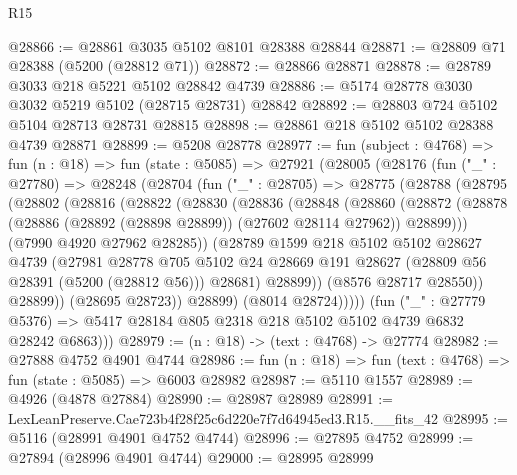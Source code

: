 \begin{lexlean}{R15}
\begin{coremodule}
{{{{{{{{{{{@28866 := @28861 @3035 @5102 @8101 @28388 @28844
@28871 := @28809 @71 @28388 (@5200 (@28812 @71))
@28872 := @28866 @28871
@28878 := @28789 @3033 @218 @5221 @5102 @28842 @4739
@28886 := @5174 @28778 @3030 @3032 @5219 @5102 (@28715 @28731) @28842
@28892 := @28803 @724 @5102 @5104 @28713 @28731 @28815
@28898 := @28861 @218 @5102 @5102 @28388 @4739 @28871
@28899 := @5208 @28778
@28977 := fun (subject : @4768) =>
  fun (n : @18) =>
  fun (state : @5085) =>
  @27921
    (@28005
      (@28176
        (fun ("_" : @27780) =>
        @28248
          (@28704
            (fun ("_" : @28705) =>
            @28775
              (@28788
                (@28795
                  (@28802
                    (@28816
                      (@28822
                        (@28830
                          (@28836
                            (@28848
                              (@28860
                                (@28872
                                  (@28878
                                    (@28886 (@28892 (@28898 @28899)) (@27602 @28114 @27962))
                                    @28899)))
                              (@7990 @4920 @27962 @28285))
                            (@28789
                              @1599
                              @218
                              @5102
                              @5102
                              @28627
                              @4739
                              (@27981
                                @28778
                                @705
                                @5102
                                @24
                                @28669
                                @191
                                @28627
                                (@28809 @56 @28391 (@5200 (@28812 @56)))
                                @28681)
                              @28899))
                          (@8576 @28717 @28550))
                        @28899))
                    (@28695 @28723))
                  @28899)
                (@8014 @28724)))))
        (fun ("_" : @27779 @5376) =>
        @5417 @28184 @805 @2318 @218 @5102 @5102 @4739 @6832 @28242 @6863)))
@28979 := (n : @18) -> (text : @4768) -> @27774
@28982 := @27888 @4752 @4901 @4744
@28986 := fun (n : @18) => fun (text : @4768) => fun (state : @5085) => @6003 @28982
@28987 := @5110 @1557
@28989 := @4926 (@4878 @27884)
@28990 := @28987 @28989
@28991 := LexLeanPreserve.Cae723b4f28f25c6d220e7f7d64945ed3.R15.__fits_42
@28995 := @5116 (@28991 @4901 @4752 @4744)
@28996 := @27895 @4752
@28999 := @27894 (@28996 @4901 @4744)
@29000 := @28995 @28999
}}}}}}}}}}}
\end{coremodule}
\end{lexlean}
